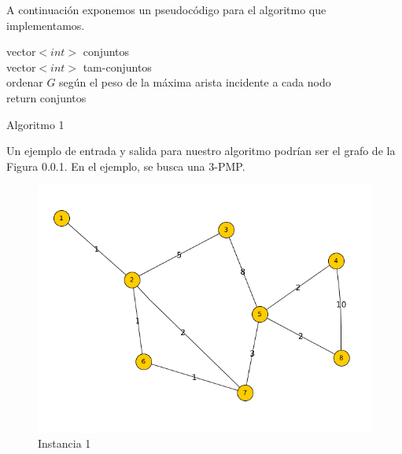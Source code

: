 \documentclass[11pt, a4paper, twoside]{article}
\begin{document}
\begin{enumerate}
\begin{enumerate}
		\end{enumerate}
		
		A continuación exponemos un pseudocódigo para el algoritmo que implementamos. \\
		\begin{algorithm}[H]
		  vector$<int>$ conjuntos \\
		  vector$<int>$ tam-conjuntos \\
		  ordenar $G$ según el peso de la máxima arista incidente a cada nodo \\
		  return conjuntos
		\caption{Algoritmo 1}
		\end{algorithm}
		
		Un ejemplo de entrada y salida para nuestro algoritmo podrían ser el grafo de la 
		Figura 0.0.1. En el ejemplo, se busca una 3-PMP.
		
		\begin{figure}[H]
		\includegraphics[scale=1]{imagenes/ej2.png}
		\caption{Instancia 1}
		\end{figure}
		

\end{enumerate}
\end{document}

